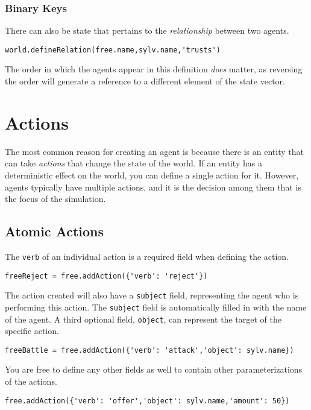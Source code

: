 \documentclass{article}
\begin{document}
\subsubsection{Binary Keys}
There can also be state that pertains to the {\em relationship} between two agents. 

\begin{verbatim}
world.defineRelation(free.name,sylv.name,'trusts')
\end{verbatim}

The order in which the agents appear in this definition {\em does} matter, as reversing the order will generate a reference to a different element of the state vector.

\section{Actions}
The most common reason for creating an agent is because there is an entity that can take {\em actions} that change the state of the world. If an entity has a deterministic effect on the world, you can define a single action for it. However, agents typically have multiple actions, and it is the decision among them that is the focus of the simulation.

\subsection{Atomic Actions}

The {\tt verb} of an individual action is a required field when defining the action. 

\begin{verbatim}
freeReject = free.addAction({'verb': 'reject'})
\end{verbatim}

The action created will also have a {\tt subject} field, representing the agent who is performing this action. The {\tt subject} field is automatically filled in with the name of the agent. A third optional field, {\tt object}, can represent the target of the specific action.

\begin{verbatim}
freeBattle = free.addAction({'verb': 'attack','object': sylv.name})
\end{verbatim}

You are free to define any other fields as well to contain other parameterizations of the actions.

\begin{verbatim}
free.addAction({'verb': 'offer','object': sylv.name,'amount': 50})
\end{verbatim}
\end{document}
